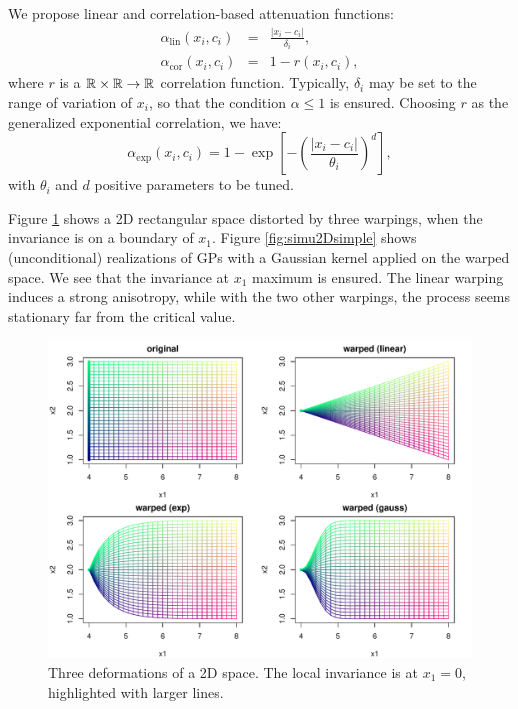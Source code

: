 We propose linear and correlation-based attenuation functions: 
\begin{eqnarray}
 \alpha_\text{lin}(x_i, c_i) &=& \frac{\lvert x_i - c_i \rvert}{\delta_i}, \\
 \alpha_\text{cor}(x_i, c_i) &=& 1 - r(x_i, c_i),
\end{eqnarray}
where $r$ is a $\mathbb{R} \times \mathbb{R}\rightarrow \mathbb{R}$ correlation function.
Typically, $\delta_i$ may be set to the range of variation of $x_i$, so that the condition $\alpha \leq 1$ is ensured.
Choosing $r$ as the generalized exponential correlation, we have:
\begin{equation}
   \alpha_\text{exp}(x_i, c_i) = 1 - \exp \left[ - \left(\frac{\lvert x_i - c_i \rvert}{\theta_i}\right)^d \right],
\end{equation}
with $\theta_i$ and $d$ positive parameters to be tuned. 

Figure \ref{fig:3defsimple} shows a 2D rectangular space distorted by three warpings, when the invariance is on a boundary of $x_1$.
Figure \ref{fig:simu2Dsimple} shows (unconditional) realizations of GPs with a Gaussian kernel applied on the warped space. 
We see that the invariance at $x_1$ maximum is ensured. The linear warping induces a strong anisotropy, while with the two other warpings,
the process seems stationary far from the critical value.

\begin{figure}[!ht]
\centering
 \includegraphics[width=.8\textwidth]{def2Dsimple.pdf}
 \caption{Three deformations of a 2D space. The local invariance is at $x_1=0$, highlighted with larger lines.}\label{fig:3defsimple}
\end{figure}

